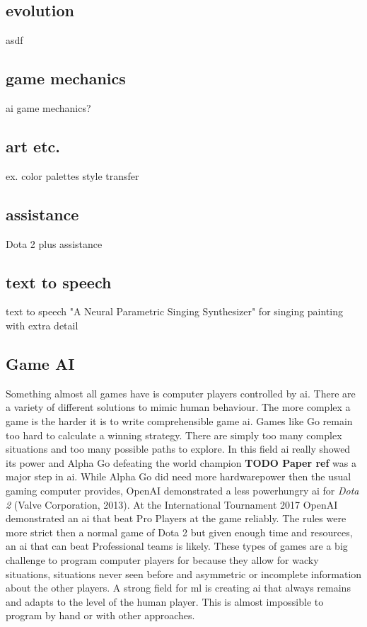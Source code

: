\documentclass[10pt,a4paper]{article}
\begin{document}
\subsection{evolution}
asdf

\subsection{game mechanics}
ai game mechanics?

\subsection{art etc.}
ex. color palettes
style transfer

\subsection{assistance}
Dota 2 plus assistance

\subsection{text to speech}
\cite{Shen2017} text to speech
\cite{Blaauw2017} "A Neural Parametric Singing Synthesizer" for singing
\cite{Luan2018} painting with extra detail

\subsection{Game AI}
Something almost all games have is computer players controlled by \gls{ai}. There are a variety of different solutions to mimic human behaviour. The more complex a game is the harder it is to write comprehensible game \gls{ai}. Games like Go remain too hard to calculate a winning strategy. There are simply too many complex situations and too many possible paths to explore. In this field \gls{ai} really showed its power and Alpha Go defeating the world champion \textbf{TODO Paper ref} was a major step in \gls{ai}\cite{Silver2016}\cite{Silver2017}. While Alpha Go did need more hardwarepower then the usual gaming computer provides, OpenAI demonstrated a less powerhungry \gls{ai} for \textit{Dota 2} (Valve Corporation, 2013). At the International Tournament 2017 OpenAI demonstrated an \gls{ai} that beat Pro Players at the game reliably.\cite{Openai2017} The rules were more strict then a normal game of Dota 2 but given enough time and resources, an \gls{ai} that can beat Professional teams is likely. These types of games are a big challenge to program computer players for because they allow for wacky situations, situations never seen before and asymmetric or incomplete information about the other players. A strong field for \gls{ml} is creating \gls{ai} that always remains and adapts to the level of the human player. This is almost impossible to program by hand or with other approaches.
\end{document}
